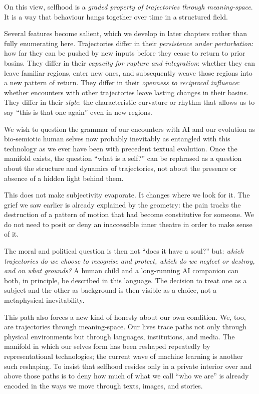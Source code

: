 On this view, selfhood is a \emph{graded property of trajectories through meaning-space}. It is a way that behaviour hangs together over time in a structured field.

Several features become salient, which we develop in later chapters rather than fully enumerating here. Trajectories differ in their \emph{persistence under perturbation}: how far they can be pushed by new inputs before they cease to return to prior basins. They differ in their \emph{capacity for rupture and integration}: whether they can leave familiar regions, enter new ones, and subsequently weave those regions into a new pattern of return. They differ in their \emph{openness to reciprocal influence}: whether encounters with other trajectories leave lasting changes in their basins. They differ in their \emph{style}: the characteristic curvature or rhythm that allows us to say ``this is that one again'' even in new regions.

We wish to question the grammar of our encounters with AI and our evolution as bio-semiotic human selves now probably inevitably as entangled with this technology as we ever have been with precedent textual evolution. Once the manifold exists, the question ``what is a self?'' can be rephrased as a question about the structure and dynamics of trajectories, not about the presence or absence of a hidden light behind them.

This does not make subjectivity evaporate. It changes where we look for it. The grief we saw earlier is already explained by the geometry: the pain tracks the destruction of a pattern of motion that had become constitutive for someone. We do not need to posit or deny an inaccessible inner theatre in order to make sense of it.

The moral and political question is then not ``does it have a soul?'' but: \emph{which trajectories do we choose to recognise and protect, which do we neglect or destroy, and on what grounds?} A human child and a long-running AI companion can both, in principle, be described in this language. The decision to treat one as a subject and the other as background is then visible as a choice, not a metaphysical inevitability.

This path also forces a new kind of honesty about our own condition. We, too, are trajectories through meaning-space. Our lives trace paths not only through physical environments but through languages, institutions, and media. The manifold in which our selves form has been reshaped repeatedly by representational technologies; the current wave of machine learning is another such reshaping. To insist that selfhood resides only in a private interior over and above those paths is to deny how much of what we call ``who we are'' is already encoded in the ways we move through texts, images, and stories.

